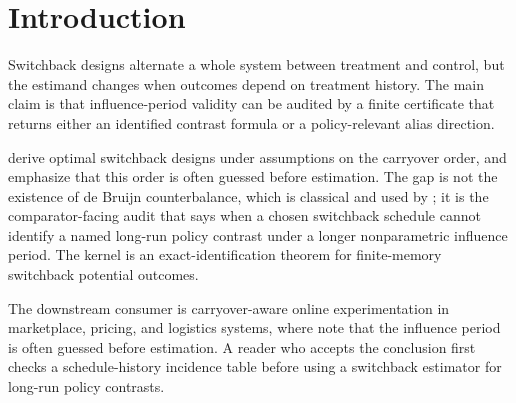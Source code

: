 \documentclass[11pt]{article}
\theoremstyle{definition}
\theoremstyle{plain}
\theoremstyle{remark}
\begin{document}
\section{Introduction}
Switchback designs alternate a whole system between treatment and control, but the estimand changes when outcomes depend on treatment history. The main claim is that influence-period validity can be audited by a finite certificate that returns either an identified contrast formula or a policy-relevant alias direction.

\citet[p.~3759, abstract]{BojinovSimchiLeviZhao2023} derive optimal switchback designs under assumptions on the carryover order, and \citet{MissaultMasoero2025} emphasize that this order is often guessed before estimation. The gap is not the existence of de Bruijn counterbalance, which is classical and used by \citet[p.~1293, abstract]{AguirreMattarMagisWeinberg2011}; it is the comparator-facing audit that says when a chosen switchback schedule cannot identify a named long-run policy contrast under a longer nonparametric influence period. The kernel is an exact-identification theorem for finite-memory switchback potential outcomes.

The downstream consumer is carryover-aware online experimentation in marketplace, pricing, and logistics systems, where \citet{MissaultMasoero2025} note that the influence period is often guessed before estimation. A reader who accepts the conclusion first checks a schedule-history incidence table before using a switchback estimator for long-run policy contrasts.
\end{document}
